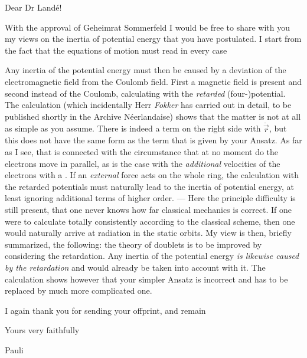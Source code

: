 \begin{letter}{6}
\begin{header}
\date{1920/05/12}

\makeheader

\end{header}

Dear Dr Land\'e!

With the approval of Geheimrat Sommerfeld I would be free to share with you my views on the inertia of potential energy that you have postulated. I start from the fact that the equations of motion must read in every case

Any inertia of the potential energy must then be caused by a deviation of the electromagnetic field from the Coulomb field. First a magnetic field is present and second instead of the Coulomb, calculating with the \textit{retarded} (four-)potential. The calculation (which incidentally Herr \textit{Fokker} has carried out in detail, to be published shortly in the Archive Néerlandaise) shows that the matter is not at all as simple as you assume. There is indeed a term on the right side with $\ddot{\vec{r}}$, but this does not have the same form as the term that is given by your Ansatz. As far as I see, that is connected with the circumstance that at no moment do the electrons move in parallel, as is the case with the \textit{additional} velocities of the electrons with a . If an \textit{external} force acts on the whole ring, the calculation with the retarded potentials must naturally lead to the inertia of potential energy, at least ignoring additional terms of higher order. — Here the principle difficulty is still present, that one never knows how far classical mechanics is correct. If one were to calculate totally consistently according to the classical scheme, then one would naturally arrive at radiation in the static orbits. My view is then, briefly summarized, the following: the theory of doublets is to be improved by considering the retardation. Any inertia of the potential energy \textit{is likewise caused by the retardation} and would already be taken into account with it. The calculation shows however that your simpler Ansatz is incorrect and has to be replaced by much more complicated one.

I again thank you for sending your offprint, and remain

Yours very faithfully

Pauli
\end{letter}